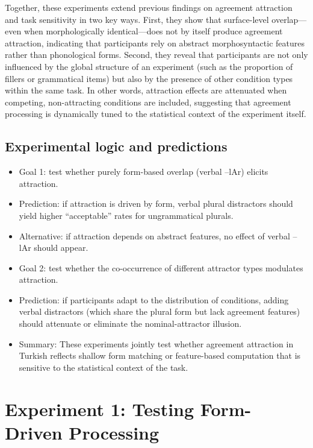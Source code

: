 \documentclass[
  authoryear,
  preprint]{elsarticle}
\begin{document}
Together, these experiments extend previous findings on agreement
attraction and task sensitivity in two key ways. First, they show that
surface-level overlap---even when morphologically identical---does not
by itself produce agreement attraction, indicating that participants
rely on abstract morphosyntactic features rather than phonological
forms. Second, they reveal that participants are not only influenced by
the global structure of an experiment (such as the proportion of fillers
or grammatical items) but also by the presence of other condition types
within the same task. In other words, attraction effects are attenuated
when competing, non-attracting conditions are included, suggesting that
agreement processing is dynamically tuned to the statistical context of
the experiment itself.

\subsection{Experimental logic and
predictions}\label{experimental-logic-and-predictions}

\begin{itemize}
\item
  Goal 1: test whether purely form-based overlap (verbal --lAr) elicits
  attraction.
\item
  Prediction: if attraction is driven by form, verbal plural distractors
  should yield higher ``acceptable'' rates for ungrammatical plurals.
\item
  Alternative: if attraction depends on abstract features, no effect of
  verbal --lAr should appear.
\item
  Goal 2: test whether the co-occurrence of different attractor types
  modulates attraction.
\item
  Prediction: if participants adapt to the distribution of conditions,
  adding verbal distractors (which share the plural form but lack
  agreement features) should attenuate or eliminate the
  nominal-attractor illusion.
\item
  Summary: These experiments jointly test whether agreement attraction
  in Turkish reflects shallow form matching or feature-based computation
  that is sensitive to the statistical context of the task.
\end{itemize}

\section{Experiment 1: Testing Form-Driven
Processing}\label{experiment-1-testing-form-driven-processing}
\end{document}
